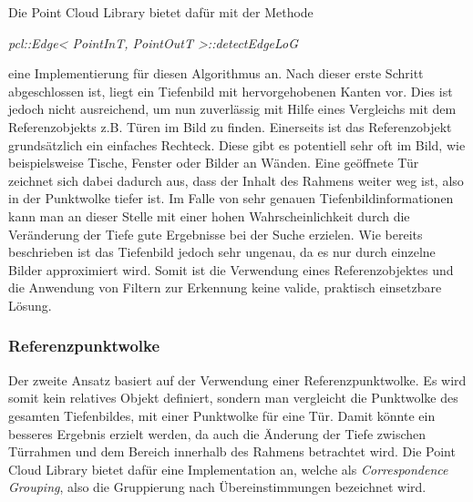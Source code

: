 Die Point Cloud Library bietet dafür mit der Methode
\begin{center}
	\textit{pcl::Edge< PointInT, PointOutT >::detectEdgeLoG}
\end{center} 
eine Implementierung für diesen Algorithmus an. \cite{pclDocs} \newline
Nach dieser erste Schritt abgeschlossen ist, liegt ein Tiefenbild mit hervorgehobenen Kanten vor. Dies ist jedoch nicht ausreichend, um nun zuverlässig mit Hilfe eines Vergleichs mit dem Referenzobjekts z.B. Türen im Bild zu finden. \newline
Einerseits ist das Referenzobjekt grundsätzlich ein einfaches Rechteck. Diese gibt es potentiell sehr oft im Bild, wie beispielsweise Tische, Fenster oder Bilder an Wänden. Eine geöffnete Tür zeichnet sich dabei dadurch aus, dass der Inhalt des Rahmens weiter weg ist, also in der Punktwolke tiefer ist. Im Falle von sehr genauen Tiefenbildinformationen kann man an dieser Stelle mit einer hohen Wahrscheinlichkeit durch die Veränderung der Tiefe gute Ergebnisse bei der Suche erzielen. \newline
Wie bereits beschrieben ist das Tiefenbild jedoch sehr ungenau, da es nur durch einzelne Bilder approximiert wird. Somit ist die Verwendung eines Referenzobjektes und die Anwendung von Filtern zur Erkennung keine valide, praktisch einsetzbare Lösung. \newline

\subsubsection{Referenzpunktwolke}
Der zweite Ansatz basiert auf der Verwendung einer Referenzpunktwolke. Es wird somit kein relatives Objekt definiert, sondern man vergleicht die Punktwolke des gesamten Tiefenbildes, mit einer Punktwolke für eine Tür. \newline
Damit könnte ein besseres Ergebnis erzielt werden, da auch die Änderung der Tiefe zwischen Türrahmen und dem Bereich innerhalb des Rahmens betrachtet wird. Die Point Cloud Library bietet dafür eine Implementation an, welche als \textit{Correspondence Grouping}, also die Gruppierung nach Übereinstimmungen bezeichnet wird.

